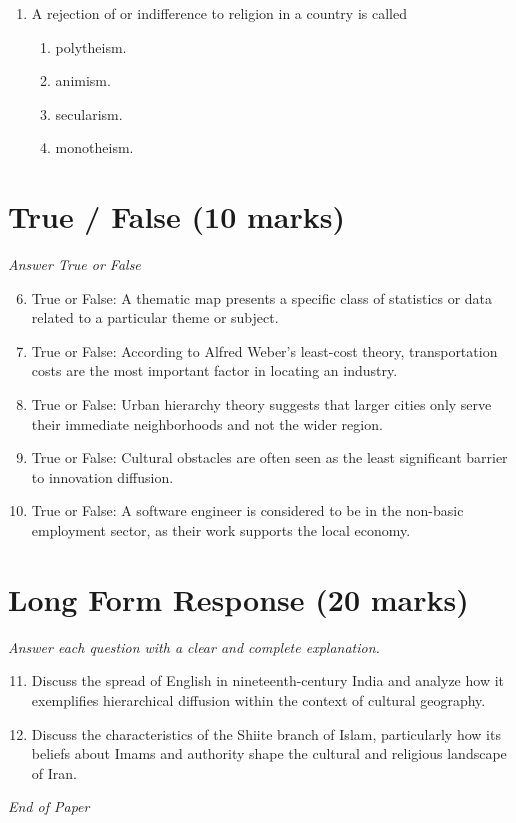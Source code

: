 \documentclass[12pt]{article}
\begin{document}
\begin{enumerate}[label=\arabic*.]
\begin{enumerate}[label=(\alph*)]
    \item Muslims immigrants from North Africa are well integrated in France.
    \item Immigrants to European cities rarely bring their families.
    \item They are usually restricted to certain neighborhoods.
\end{enumerate}
\item A rejection of or indifference to religion in a country is called
\begin{enumerate}[label=(\alph*)]
    \item polytheism.
    \item animism.
    \item secularism.
    \item monotheism.
\end{enumerate}
\end{enumerate}

\section*{True / False (10 marks)}
\textit{Answer True or False}
\begin{enumerate}[label=\arabic*.]
\setcounter{enumi}{5}
\item True or False: A thematic map presents a specific class of statistics or data related to a particular theme or subject.
\item True or False: According to Alfred Weber's least-cost theory, transportation costs are the most important factor in locating an industry.
\item True or False: Urban hierarchy theory suggests that larger cities only serve their immediate neighborhoods and not the wider region.
\item True or False: Cultural obstacles are often seen as the least significant barrier to innovation diffusion.
\item True or False: A software engineer is considered to be in the non-basic employment sector, as their work supports the local economy.
\end{enumerate}

\section*{Long Form Response (20 marks)}
\textit{Answer each question with a clear and complete explanation.}
\begin{enumerate}[label=\arabic*.]
\setcounter{enumi}{10}
\item Discuss the spread of English in nineteenth-century India and analyze how it exemplifies hierarchical diffusion within the context of cultural geography.
\item Discuss the characteristics of the Shiite branch of Islam, particularly how its beliefs about Imams and authority shape the cultural and religious landscape of Iran.
\end{enumerate}

\vfill
\noindent\textit{End of Paper}
\end{document}
